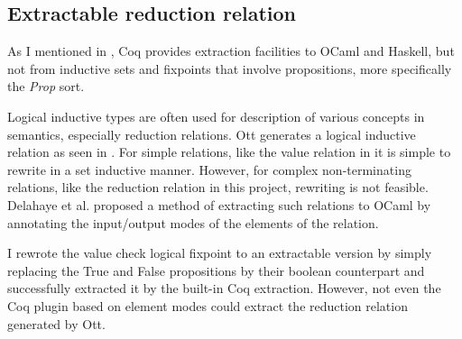 \documentclass[12pt,twoside,notitlepage]{report}
\begin{document}
\subsection{Extractable reduction relation}
As I mentioned in , Coq provides extraction facilities to OCaml and Haskell, but not from inductive sets and fixpoints that involve propositions, more specifically the \textit{Prop} sort. 

Logical inductive types are often used for description of various concepts in semantics, especially reduction relations. Ott generates a logical inductive relation as seen in . For simple relations, like the value relation in  it is simple to rewrite in a set inductive manner. However, for complex non-terminating relations, like the reduction relation in this project, rewriting is not feasible.  Delahaye et al.\cite{delahaye2007extracting,tollitte2012producing} proposed a method of extracting such relations to OCaml by annotating the input/output modes of the elements of the relation. 

I rewrote the value check logical fixpoint to an extractable version by simply replacing the True and False propositions by their boolean counterpart and successfully extracted it by the built-in Coq extraction. However, not even the Coq plugin based on element modes could extract the reduction relation generated by Ott. 
\end{document}
